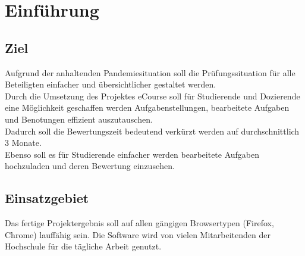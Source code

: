 
\chapter{Einführung}

\section{Ziel}
Aufgrund der anhaltenden Pandemiesituation soll die Prüfungssituation für alle Beteiligten einfacher und übersichtlicher gestaltet werden. \\
Durch die Umsetzung des Projektes eCourse soll für Studierende und Dozierende eine Möglichkeit geschaffen werden Aufgabenstellungen, bearbeitete Aufgaben und Benotungen effizient auszutauschen. \\
Dadurch soll die Bewertungszeit bedeutend verkürzt werden auf durchschnittlich 3 Monate. \\
Ebenso soll es für Studierende einfacher werden bearbeitete Aufgaben hochzuladen und deren Bewertung einzusehen. \\

\section{Einsatzgebiet}
Das fertige Projektergebnis soll auf allen gängigen Browsertypen (Firefox, Chrome) lauffähig sein. Die Software wird von vielen Mitarbeitenden der Hochschule für die tägliche Arbeit genutzt. \\

